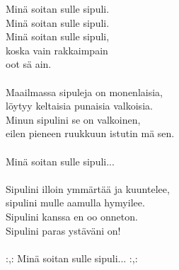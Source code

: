 
            Minä soitan sulle sipuli.  \\
            Minä soitan sulle sipuli. \\
            Minä soitan sulle sipuli, \\
            koska vain rakkaimpain \\
            oot sä ain. \\
\hspace{10mm} \\
            Maailmassa sipuleja on monenlaisia,  \\
            löytyy keltaisia punaisia valkoisia.  \\
            Minun sipulini se on valkoinen,  \\
            eilen pieneen ruukkuun istutin mä sen. \\
\hspace{10mm} \\
            Minä soitan sulle sipuli... \\
\hspace{10mm} \\
            Sipulini illoin ymmärtää ja kuuntelee,  \\
            sipulini mulle aamulla hymyilee.  \\
            Sipulini kanssa en oo onneton.  \\
            Sipulini paras ystäväni on! \\
\hspace{10mm} \\
            :,: Minä soitan sulle sipuli... :,: \\
